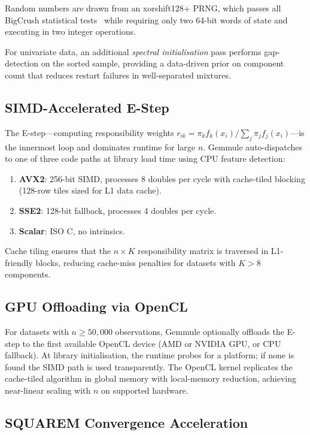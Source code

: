 ﻿\documentclass[10pt,twocolumn]{article}
\begin{document}
Random numbers are drawn from an xorshift128+ PRNG, which passes all
BigCrush statistical tests~\citep{lecuyer2007testu01} while requiring only
two 64-bit words of state and executing in two integer operations.

For univariate data, an additional \emph{spectral initialisation} pass
performs gap-detection on the sorted sample, providing a data-driven prior on
component count that reduces restart failures in well-separated mixtures.

\subsection{SIMD-Accelerated E-Step}

The E-step---computing responsibility weights
$r_{ik} = \pi_k f_k(x_i) / \sum_j \pi_j f_j(x_i)$---is the innermost loop
and dominates runtime for large $n$.
Gemmule auto-dispatches to one of three code paths at library load time
using CPU feature detection:

\begin{enumerate}[leftmargin=*,noitemsep]
  \item \textbf{AVX2}: 256-bit SIMD, processes 8 doubles per cycle with
        cache-tiled blocking (128-row tiles sized for L1 data cache).
  \item \textbf{SSE2}: 128-bit fallback, processes 4 doubles per cycle.
  \item \textbf{Scalar}: ISO C, no intrinsics.
\end{enumerate}

Cache tiling ensures that the $n \times K$ responsibility matrix is traversed
in L1-friendly blocks, reducing cache-miss penalties for datasets with
$K > 8$ components.

\subsection{GPU Offloading via OpenCL}

For datasets with $n \geq 50{,}000$ observations, Gemmule optionally
offloads the E-step to the first available OpenCL device (AMD or NVIDIA GPU,
or CPU fallback).
At library initialisation, the runtime probes for a platform; if none is
found the SIMD path is used transparently.
The OpenCL kernel replicates the cache-tiled algorithm in global memory with
local-memory reduction, achieving near-linear scaling with $n$ on supported
hardware.

\subsection{SQUAREM Convergence Acceleration}
\end{document}

